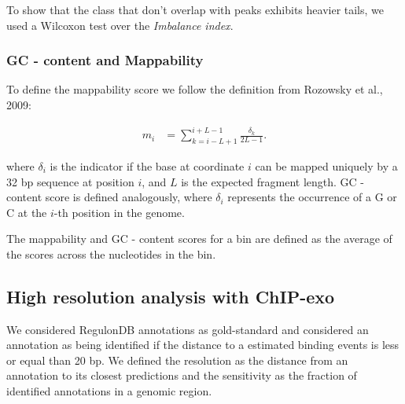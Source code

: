 \documentclass{bmcart}\usepackage[]{graphicx}\usepackage[]{color}
\begin{document}
To show that the class that don't overlap with peaks exhibits heavier
tails, we used a Wilcoxon test over the \emph{Imbalance index}.

\subsubsection*{GC - content and Mappability}

To define the mappability score we follow the definition from Rozowsky
et al., 2009:

\begin{align*}
  m_i &= \sum_{k = i - L +1}^{i + L - 1} \frac{\delta_k }{2L - 1}.
\end{align*}

where $\delta_i$ is the indicator if the base at coordinate $i$ can be
mapped uniquely by a 32 bp sequence at position $i$, and $L$ is the
expected fragment length. GC - content score is defined analogously,
where $\delta_i$ represents the occurrence of a G or C at the $i$-th
position in the genome. 

The mappability and GC - content scores for a bin are defined as the
average of the scores across the nucleotides in the bin.




\subsection*{High resolution analysis with ChIP-exo}

We considered RegulonDB \cite{regulondb} annotations as gold-standard
and considered an annotation as being identified if the distance to a
estimated binding events is less or equal than 20 bp. We
defined the resolution as the distance from an annotation to its
closest predictions and  the sensitivity as the fraction of identified
annotations in a genomic region.
\end{document}
